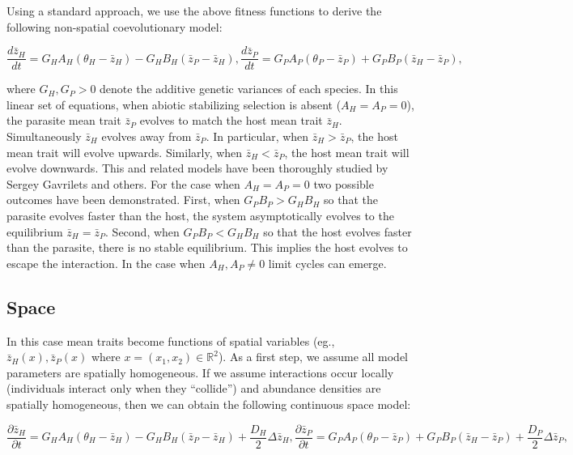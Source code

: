 \documentclass{article}
\begin{document}
Using a standard approach, we use the above fitness functions to derive
the following non-spatial coevolutionary model:

\begin{subequations}\label{non-spatial}
  \begin{equation}
    \frac{d\bar z_H}{dt}=G_HA_H(\theta_H-\bar z_H)-G_HB_H(\bar z_P-\bar z_H),
  \end{equation}
  \begin{equation}
    \frac{d\bar z_P}{dt}=G_PA_P(\theta_P-\bar z_P)+G_PB_P(\bar z_H-\bar z_P),
  \end{equation}
\end{subequations}

where \(G_H,G_P>0\) denote the additive genetic variances of each
species. In this linear set of equations, when abiotic stabilizing
selection is absent (\(A_H=A_P=0\)), the parasite mean trait
\(\bar z_P\) evolves to match the host mean trait \(\bar z_H\).
Simultaneously \(\bar z_H\) evolves away from \(\bar z_P\). In
particular, when \(\bar z_H>\bar z_P\), the host mean trait will evolve
upwards. Similarly, when \(\bar z_H<\bar z_P\), the host mean trait will
evolve downwards. This and related models have been thoroughly studied
by Sergey Gavrilets and others. For the case when \(A_H=A_P=0\) two
possible outcomes have been demonstrated. First, when \(G_PB_P>G_HB_H\)
so that the parasite evolves faster than the host, the system
asymptotically evolves to the equilibrium \(\bar z_H=\bar z_P\). Second,
when \(G_PB_P<G_HB_H\) so that the host evolves faster than the
parasite, there is no stable equilibrium. This implies the host evolves
to escape the interaction. In the case when \(A_H,A_P\neq0\) limit
cycles can emerge.

\hypertarget{space}{%
\subsection{Space}\label{space}}

In this case mean traits become functions of spatial variables (eg.,
\(\bar z_H(x),\bar z_P(x)\) where \(x=(x_1,x_2)\in\mathbb R^2\)). As a
first step, we assume all model parameters are spatially homogeneous. If
we assume interactions occur locally (individuals interact only when
they \enquote{collide}) and abundance densities are spatially
homogeneous, then we can obtain the following continuous space model:

\begin{subequations}\label{deterministic}
  \begin{equation}
    \frac{\partial\bar z_H}{\partial t}=G_HA_H(\theta_H-\bar z_H)-G_HB_H(\bar z_P-\bar z_H)+\frac{D_H}{2}\Delta\bar z_H,
  \end{equation}
  \begin{equation}
    \frac{\partial\bar z_P}{\partial t}=G_PA_P(\theta_P-\bar z_P)+G_PB_P(\bar z_H-\bar z_P)+\frac{D_P}{2}\Delta\bar z_P,
  \end{equation}
\end{subequations}
\end{document}

